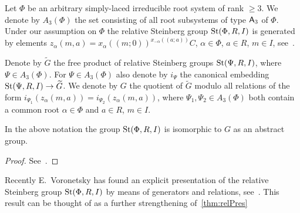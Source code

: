 Let $\Phi$ be an arbitrary simply-laced irreducible root system of rank $\geq 3$.
We denote by $A_3(\Phi)$ the set consisting of all root subsystems of type $\mathsf{A}_3$ of $\Phi$.
Under our assumption on $\Phi$ the relative Steinberg group $\operatorname{St}(\Phi, R, I)$ is generated by elements
$z_\alpha(m, a) = x_\alpha((m; 0))^{x_{-\alpha}((a; a))}C$, $\alpha \in \Phi$, $a \in R$, $m \in I$, see~\cite[\S~3.1]{S15}.

Denote by $\widetilde{G}$ the free product of relative Steinberg groups $\operatorname{St}(\Psi, R, I)$, where $\Psi \in A_3(\Phi)$.
For $\Psi \in A_3(\Phi)$ also denote by $i_\Psi$ the canonical embedding $\operatorname{St}(\Psi, R, I) \to \widetilde{G}$.
We denote by $G$ the quotient of $\widetilde{G}$ modulo all relations of the form $i_{\Psi_1}(z_\alpha(m, a)) = i_{\Psi_2}(z_\alpha(m, a))$,
where $\Psi_1, \Psi_2 \in A_3(\Phi)$ both contain a common root $\alpha \in \Phi$ and $a\in R$, $m \in I$.

\begin{thm}\label{thm:relPres} In the above notation the group $\operatorname{St}(\Phi, R, I)$ is isomorphic to $G$ as an abstract group. \end{thm}
\begin{proof}
    See~\cite[\S~2]{LS20}.
\end{proof}

\begin{rem}
    Recently E.~Voronetsky has found an explicit presentation of the relative Steinberg group $\operatorname{St}(\Phi, R, I)$
     by means of generators and relations, see~\cite{V22}.
    This result can be thought of as a further strengthening of~\cref{thm:relPres}
\end{rem}
